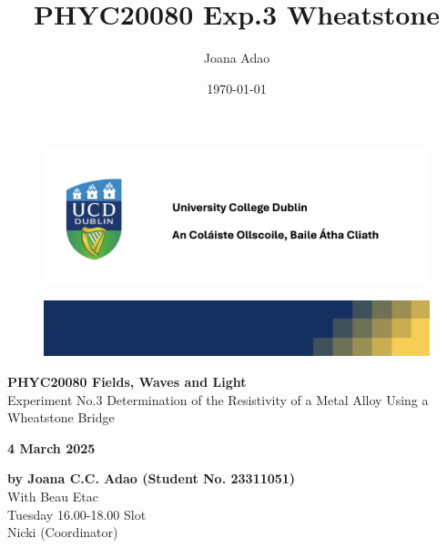 \documentclass[12pt]{article}
\title{PHYC20080 Exp.3 Wheatstone}
\author{Joana Adao}
\date{\today}
\begin{document}
\begin{titlepage}
    \begin{center}

        \begin{figure}[ht]
            \includegraphics[width=\textwidth]{UCDLogo.png}
        \end{figure}
        
        \begin{figure}
            \centerline{\includegraphics[width=\paperwidth]{UCDBanner.png}}
        \end{figure}

        \vspace{4cm}

        {\LARGE \bfseries PHYC20080 Fields, Waves and Light}\\
        \vspace{0.75cm}
        {\Large Experiment No.3 Determination of the Resistivity of a Metal Alloy Using a Wheatstone Bridge}
        
        \vspace{1cm}
    
    {\Large \textbf{4 March 2025}}
    
    \vspace{2cm}
    
    {\large \textbf{by Joana C.C. Adao (Student No. 23311051)}}\\
    \vspace{.25cm}
    {\large With Beau Etac}\\
    \vspace{0.25cm}
    {\large Tuesday 16.00-18.00 Slot}\\
    {\large Nicki (Coordinator)}

    \end{center}
    
   \clearpage

\end{titlepage}
\end{document}
